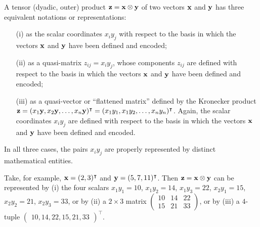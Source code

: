 A tensor (dyadic, outer) product ${\bf z} = {\bf x} \otimes {\bf y}$ of two vectors ${\bf x}$ and ${\bf y}$
has three equivalent notations or representations:
\begin{itemize}
\item[(i)]
as the scalar coordinates $x_iy_j$ with respect to the basis in which the vectors ${\bf  x}$ and ${\bf y}$ have been defined and encoded;
\item[(ii)]
as a quasi-matrix $z_{ij}  =x_iy_j$,
whose components $z_{ij}$ are  defined with respect to the basis in which the vectors ${\bf  x}$ and ${\bf y}$
have been defined and encoded;
\item[(iii)]
as a quasi-vector or ``flattened matrix'' defined by the Kronecker product
${\bf z} = ({ x}_1  {\bf y}, { x}_2  {\bf y}, \ldots , { x}_n  {\bf y})^\intercal =
({ x}_1  { y}_1, { x}_1  { y}_2, \ldots , { x}_n  { y}_n)^\intercal
$. Again, the scalar coordinates $x_iy_j$ are defined
with respect to the basis in which the vectors ${\bf  x}$ and ${\bf y}$ have been defined and encoded.
\end{itemize}
In all three cases, the pairs $x_i y_j$  are properly represented by distinct mathematical entities.

{\color{blue}
\bexample
Take, for example,
${\bf x}=(2,3)^\intercal $
and
${\bf y}=(5,7,11)^\intercal $.
Then ${\bf z} = {\bf x} \otimes {\bf y}$  can be represented by
(i) the four scalars
$x_1y_1=10$,
$x_1y_2=14$,
$x_1y_3=22$,
$x_2y_1=15$,
$x_2y_2=21$,
$x_2y_3=33$,
or by
(ii) a $2 \times 3$ matrix
$
\begin{pmatrix}
10&14&22\\
15&21&33
\end{pmatrix}
$,
or by
(iii) a $4$-tuple
$
\begin{pmatrix}  10,14,22,15,21,33\end{pmatrix} ^\intercal
$.
\eexample
}

